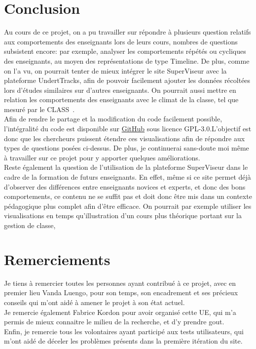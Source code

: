 \documentclass{article}
\begin{document}
\section{Conclusion}
Au cours de ce projet, on a pu travailler sur répondre à plusieurs question relatifs aux comportements des enseignants lors de leurs cours, nombres de questions subsistent encore: par exemple, analyser les comportements répétés ou cycliques des enseignants, au moyen des représentations de type Timeline. De plus, comme on l'a vu, on pourrait tenter de mieux intégrer le site SuperViseur avec la plateforme UndertTracks, afin de pouvoir facilement ajouter les données récoltées lors d'études similaires sur d'autres enseignants. On pourrait aussi mettre en relation les comportements des enseignants avec le climat de la classe, tel que mesuré par le CLASS~\cite{CLASS}.\\
Afin de rendre le partage et la modification du code facilement possible, l'intégralité du code est disponible sur \href{https://github.com/Vertmo/SuperViseur}{GitHub} sous licence GPL-3.0.L'objectif est donc que les chercheurs puissent étendre ces visualisations afin de répondre aux types de questions posées ci-dessus. De plus, je continuerai sans-doute moi même à travailler sur ce projet pour y apporter quelques améliorations.\\
Reste également la question de l'utilisation de la plateforme SuperViseur dans le cadre de la formation de futurs enseignants. En effet, même si ce site permet déjà d'observer des différences entre enseignants novices et experts, et donc des bons comportements, ce contenu ne se suffit pas et doit donc être mis dans un contexte pédagogique plus complet afin d'être efficace. On pourrait par exemple utiliser les visualisations en temps qu'illustration d'un cours plus théorique portant sur la gestion de classe, 

\section{Remerciements}
Je tiens à remercier toutes les personnes ayant contribué à ce projet, avec en premier lieu Vanda Luengo, pour son temps, son encadrement et ses précieux conseils qui m'ont aidé à amener le projet à son état actuel.\\
Je remercie également Fabrice Kordon pour avoir organisé cette UE, qui m'a permis de mieux connaitre le milieu de la recherche, et d'y prendre gout.\\
Enfin, je remercie tous les volontaires ayant participé aux tests utilisateurs, qui m'ont aidé de déceler les problèmes présents dans la première itération du site.

{}

\end{document}
